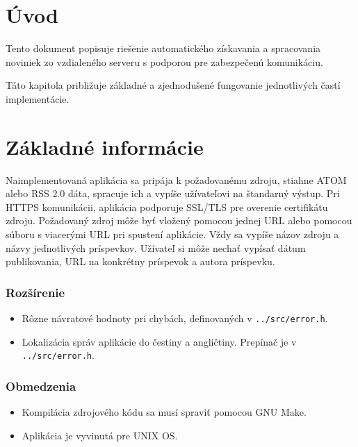 \chapter{Úvod}
Tento dokument popisuje riešenie automatického získavania a spracovania noviniek zo vzdialeného serveru s podporou pre zabezpečenú komunikáciu. 

Táto kapitola približuje základné a zjednodušené fungovanie jednotlivých častí implementácie.

\chapter{Základné informácie}
\label{basic_info}
Naimplementovaná aplikácia sa pripája k požadovanému zdroju, stiahne ATOM alebo RSS 2.0 dáta, spracuje ich a vypíše užívateľovi na štandarný výstup. Pri HTTPS komunikácii, aplikácia podporuje SSL/TLS pre overenie certifikátu zdroju.
Požadovaný zdroj môže byť vložený pomocou jednej URL alebo pomocou súboru s viacerými URL pri spustení aplikácie.
Vždy sa vypíše názov zdroju a názvy jednotlivých príspevkov.
Užívateľ si môže nechať vypísať dátum publikovania, URL na konkrétny príspevok a autora príspevku.

\subsection*{Rozšírenie}
\begin{itemize}
  \item{Rôzne návratové hodnoty pri chybách, definovaných v {\tt../src/error.h}.}
  \item{Lokalizácia správ aplikácie do čestiny a angličtiny. Prepínač je v {\tt../src/error.h}.}
\end{itemize}

\subsection*{Obmedzenia}
\begin{itemize}
  \item{Kompilácia zdrojového kódu sa musí spraviť pomocou GNU Make.}
  \item{Aplikácia je vyvinutá pre UNIX OS.}
\end{itemize}

